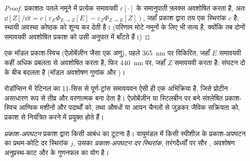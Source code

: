 \begin{proof}
प्रकाशतः पतले नमूने में प्रत्येक समावयवी $\varepsilon[\cdot]$ के समानुपाती फ़्लक्स अवशोषित करता है, अतः
$\dd[Z]/\dd t = c(\varepsilon_E\Phi_{E\to Z}[E] - \varepsilon_Z\Phi_{Z\to E}[Z])$, जहाँ प्रकाश द्वारा तय एक स्थिरांक $c$ है;
स्थायी अवस्था कोष्ठक को शून्य कर देती है। (परिणाम मोटे नमूनों के लिए भी सत्य है,
क्योंकि तब दोनों समावयवी अवशोषित प्रकाश को उसी अनुपात में बाँटते हैं।)
\end{proof}

\begin{omfigure}

{\small एक मॉडल प्रकाश-स्विच (ऐज़ोबेंज़ीन जैसा एक अणु), पहले \qty{365}{nm} पर विकिरित, जहाँ
$E$ समावयवी कहीं अधिक प्रबलता से अवशोषित करता है, फिर \qty{440}{nm} पर, जहाँ $Z$ समावयवी करता है:
संघटन दो  के बीच बदलता है (मॉडल
अवशोषण गुणांक और )।}
\end{omfigure}

रोडॉप्सिन में रेटिनल का 11-सिस से पूर्ण-ट्रांस समावयवन ऐसी ही एक
अभिक्रिया है, जिसे प्रोटीन असाधारण रूप से तीव्र और वरणात्मक बना देता है। ऐज़ोबेंज़ीन या
स्टिलबीन पर बने संश्लेषित प्रकाश-स्विच आण्विक मशीनों और पदार्थों को, तथा औषधों या आयन
चैनलों से जुड़कर जैविक सक्रियता को, प्रकाश से नियंत्रित करने में प्रयुक्त होते हैं।

\begin{definition}[प्रकाश-अपघटन]\label{def:b3:photochemistry:photolysis}
\emph{प्रकाश-अपघटन} प्रकाश द्वारा किसी आबंध का टूटना है।
वायुमंडल में किसी स्पीशीज़ के प्रकाश-अपघटन का प्रथम-कोटि दर स्थिरांक $j$, उसका
\emph{प्रकाश-अपघटन दर स्थिरांक}, तरंगदैर्ध्यों पर
सौर , अवशोषण अनुप्रस्थ-काट और  के गुणनफल का
योग है।
\end{definition}

